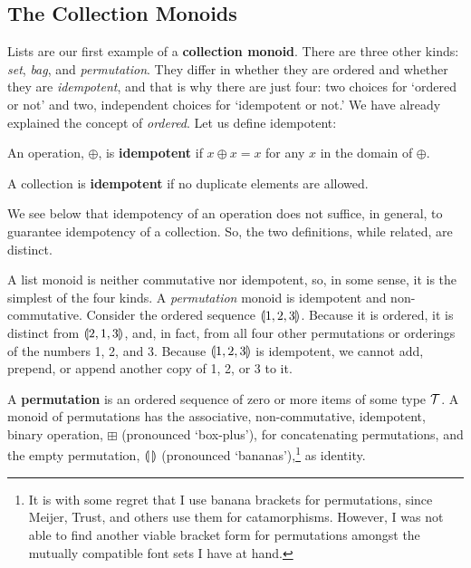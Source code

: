 \subsection{\color{Red}The Collection Monoids}


Lists are our first example of a \textbf{collection monoid}. There are three other kinds: \emph{set}, \emph{bag}, and \emph{permutation}. They differ in whether they are ordered and whether they are \emph{idempotent}, and that is why there are just four: two choices for `ordered or not' and two, independent choices for `idempotent or not.' We have already explained the concept of \emph{ordered}. Let us define idempotent:
\begin{definition}
An operation, $\oplus$, is \textbf{idempotent} if $x\oplus x=x$ for any $x$ in the domain of $\oplus$.
\label{def:idempotentoperation}
\end{definition}
\begin{definition}
A collection is \textbf{idempotent} if no duplicate elements are allowed.
\label{def:idempotentcollection}
\end{definition}


We see below that idempotency of an operation does not suffice, in general, to guarantee idempotency of a collection. So, the two definitions, while related, are distinct.


A list monoid is neither commutative nor idempotent, so, in some sense, it is the simplest of the four kinds. A \emph{permutation} monoid is idempotent and non-commutative. Consider the ordered sequence $\llparenthesis 1, 2, 3 \rrparenthesis$. Because it is ordered, it is distinct from $\llparenthesis 2, 1, 3 \rrparenthesis$, and, in fact, from all four other permutations or orderings of the numbers 1, 2, and 3. Because $\llparenthesis 1, 2, 3 \rrparenthesis$ is idempotent, we cannot add, prepend, or append another copy of 1, 2, or 3 to it.


\begin{trial}
  A \textbf{permutation} is an ordered sequence of zero or more items of some type $\mathcal{T}$. A monoid of permutations has the associative, non-commutative, idempotent, binary operation, $\boxplus$ (pronounced `box-plus'), for concatenating permutations, and the empty permutation, $\llparenthesis\,\rrparenthesis$ (pronounced `bananas'),\footnote{It is with some regret that I use banana brackets for permutations, since Meijer, Trust, and others use them for catamorphisms. However, I was not able to find another viable bracket form for permutations amongst the mutually compatible font sets I have at hand.} as identity.
\end{trial}


